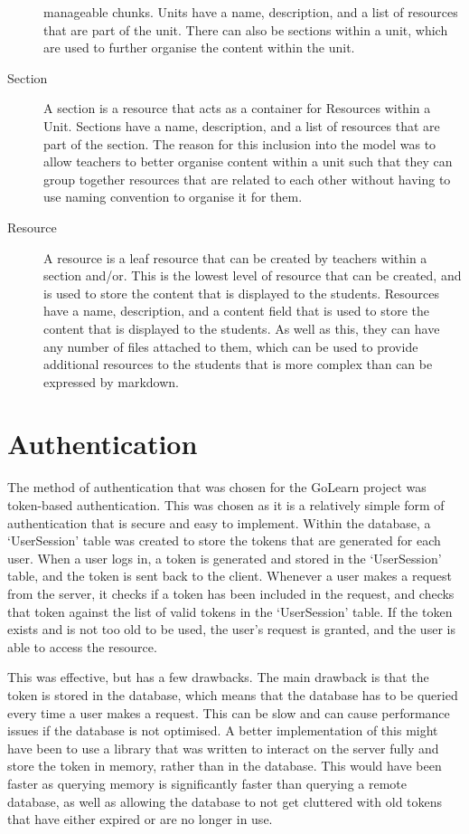 \documentclass[11pt, a4paper,twoside]{report}
\theoremstyle{plain} %
\theoremstyle{definition} %
\numberwithin{equation}{chapter}
\begin{document}
\begin{description}
{        manageable chunks. Units have a name, description, and a list of
        resources that are part of the unit. There can also be sections within
        a unit, which are used to further organise the content within the unit.
        }
    \item[Section] {
        A section is a resource that acts as a container for Resources within a
        Unit. Sections have a name, description, and a list of resources that
        are part of the section. The reason for this inclusion into the model
        was to allow teachers to better organise content within a unit such
        that they can group together resources that are related to each other
        without having to use naming convention to organise it for them.
        }
    \item[Resource] {
        A resource is a leaf resource that can be created by teachers within a
        section and/or. This is the lowest level of resource that can be
        created, and is used to store the content that is displayed to the
        students. Resources have a name, description, and a content field that
        is used to store the content that is displayed to the students. As well
        as this, they can have any number of files attached to them, which can
        be used to provide additional resources to the students that is more
        complex than can be expressed by markdown.
        }
\end{description}

\section{Authentication}\label{sec:authentication}

The method of authentication that was chosen for the GoLearn project was
token-based authentication. This was chosen as it is a relatively simple form
of authentication that is secure and easy to implement. Within the database, a
`UserSession' table was created to store the tokens that are generated for each
user. When a user logs in, a token is generated and stored in the `UserSession'
table, and the token is sent back to the client. Whenever a user makes a
request from the server, it checks if a token has been included in the request,
and checks that token against the list of valid tokens in the `UserSession'
table. If the token exists and is not too old to be used, the user's request is
granted, and the user is able to access the resource.

This was effective, but has a few drawbacks. The main drawback is that the
token is stored in the database, which means that the database has to be
queried every time a user makes a request. This can be slow and can cause
performance issues if the database is not optimised. A better implementation of
this might have been to use a library that was written to interact on the
server fully and store the token in memory, rather than in the database. This
would have been faster as querying memory is significantly faster than querying
a remote database, as well as allowing the database to not get cluttered with
old tokens that have either expired or are no longer in use.
\end{document}
